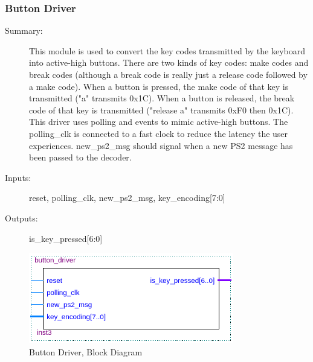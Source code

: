 \documentclass[a4paper]{article}
\begin{document}
    \subsubsection{Button Driver}
        \begin{description}
            \item[Summary: ] This module is used to convert the key codes transmitted by the keyboard into active-high buttons.  There are two kinds of key codes: make codes and break codes (although a break code is really just a release code followed by a make code).  When a button is pressed, the make code of that key is transmitted ("a" transmits 0x1C).  When a button is released, the break code of that key is transmitted ("release a" transmits 0xF0 then 0x1C).  This driver uses polling and events to mimic active-high buttons.  The polling\_clk is connected to a fast clock to reduce the latency the user experiences.  new\_ps2\_msg should signal when a new PS2 message has been passed to the decoder.
            \item[Inputs: ] reset, polling\_clk, new\_ps2\_msg, key\_encoding[7:0]
            \item[Outputs: ] is\_key\_pressed[6:0]
        \end{description}
        
        \vspace{.25 in}
        \begin{figure}[H]
          \centering
            \includegraphics[width=.75\textwidth]{Images/silas_blocks/button_driver_bd.png}
        	\caption{Button Driver, Block Diagram}
            \label{fig:button_driver_bd}
        \end{figure}
\end{document}
